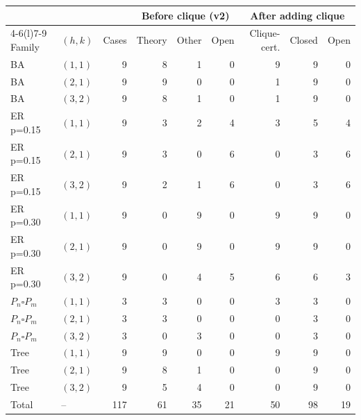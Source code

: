 \begin{tabular}{@{}llrrrrrrr@{}}
\toprule
& & & \multicolumn{3}{c}{Before clique (v2)} & \multicolumn{3}{c}{After adding clique}\\
\cmidrule(lr){4-6}\cmidrule(l){7-9}
Family & $(h,k)$ & Cases & Theory & Other & Open & Clique-cert. & Closed & Open\\
\midrule
BA & $(1,1)$ & 9 & 8 & 1 & 0 & 9 & 9 & 0\\
BA & $(2,1)$ & 9 & 9 & 0 & 0 & 1 & 9 & 0\\
BA & $(3,2)$ & 9 & 8 & 1 & 0 & 1 & 9 & 0\\
ER p=0.15 & $(1,1)$ & 9 & 3 & 2 & 4 & 3 & 5 & 4\\
ER p=0.15 & $(2,1)$ & 9 & 3 & 0 & 6 & 0 & 3 & 6\\
ER p=0.15 & $(3,2)$ & 9 & 2 & 1 & 6 & 0 & 3 & 6\\
ER p=0.30 & $(1,1)$ & 9 & 0 & 9 & 0 & 9 & 9 & 0\\
ER p=0.30 & $(2,1)$ & 9 & 0 & 9 & 0 & 9 & 9 & 0\\
ER p=0.30 & $(3,2)$ & 9 & 0 & 4 & 5 & 6 & 6 & 3\\
$P_n\square P_m$ & $(1,1)$ & 3 & 3 & 0 & 0 & 3 & 3 & 0\\
$P_n\square P_m$ & $(2,1)$ & 3 & 3 & 0 & 0 & 0 & 3 & 0\\
$P_n\square P_m$ & $(3,2)$ & 3 & 0 & 3 & 0 & 0 & 3 & 0\\
Tree & $(1,1)$ & 9 & 9 & 0 & 0 & 9 & 9 & 0\\
Tree & $(2,1)$ & 9 & 8 & 1 & 0 & 0 & 9 & 0\\
Tree & $(3,2)$ & 9 & 5 & 4 & 0 & 0 & 9 & 0\\
\midrule
Total & -- & 117 & 61 & 35 & 21 & 50 & 98 & 19\\
\bottomrule
\end{tabular}
